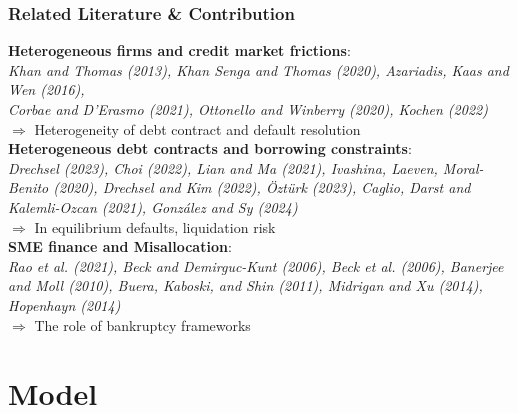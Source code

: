 \documentclass[aspectratio=169,xcolor=table]{beamer}
\begin{document}
\begin{frame}[label=lit] \frametitle{Related Literature \& \textcolor{primary}{Contribution} }

\textbf{Heterogeneous firms and credit market frictions}: \\
\footnotesize \textit{Khan and Thomas (2013), Khan Senga and Thomas (2020), Azariadis, Kaas and Wen (2016), \\ Corbae and D'Erasmo (2021), Ottonello and Winberry (2020), Kochen (2022)} \normalsize \\ 
\qquad $\Rightarrow$ \textcolor{primary}{Heterogeneity of debt contract and default resolution} \vspace{3mm} \\

\textbf{Heterogeneous debt contracts and borrowing constraints}: \\
\footnotesize \textit{Drechsel (2023), Choi (2022), Lian and Ma (2021), Ivashina, Laeven, Moral-Benito (2020), Drechsel and Kim (2022), Öztürk (2023), Caglio, Darst and Kalemli-Ozcan (2021), González and Sy (2024)} \normalsize \\ 
\qquad $\Rightarrow$ \textcolor{primary}{In equilibrium defaults, liquidation risk}\vspace{3mm} \\

\textbf{SME finance and Misallocation}: \\
\footnotesize \textit{Rao et al. (2021), Beck and Demirguc-Kunt (2006), Beck et al. (2006), Banerjee and Moll (2010), Buera, Kaboski, and Shin (2011), Midrigan and Xu (2014), Hopenhayn (2014)} \\ \normalsize 
\qquad $\Rightarrow$ \textcolor{primary}{The role of bankruptcy frameworks}

\end{frame} 



\section{Model}
\end{document}
